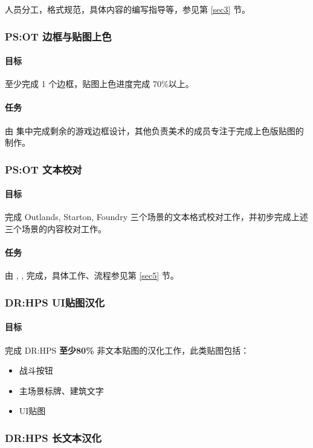 \documentclass[UTF8, a4paper, 12pt]{ctexart}
\begin{document}
人员分工，格式规范，具体内容的编写指导等，参见第 \ref{sec3} 节。

\subsubsection{PS:OT 边框与贴图上色}
\paragraph{目标} 至少完成 1 个边框，贴图上色进度完成 70\%以上。

\paragraph{任务} 由  集中完成剩余的游戏边框设计，其他负责美术的成员专注于完成上色版贴图的制作。

\subsubsection{PS:OT 文本校对}
\paragraph{目标} 完成 Outlands, Starton, Foundry 三个场景的文本格式校对工作，并初步完成上述三个场景的内容校对工作。

\paragraph{任务} 由 , ,  完成，具体工作、流程参见第 \ref{sec5} 节。

\subsubsection{DR:HPS UI贴图汉化}
\paragraph{目标} 完成 DR:HPS \textbf{至少80\%} 非文本贴图的汉化工作，此类贴图包括：

\begin{itemize}
    \item 战斗按钮
    \item 主场景标牌、建筑文字
    \item UI贴图
\end{itemize}

\subsubsection{DR:HPS 长文本汉化}
\end{document}
